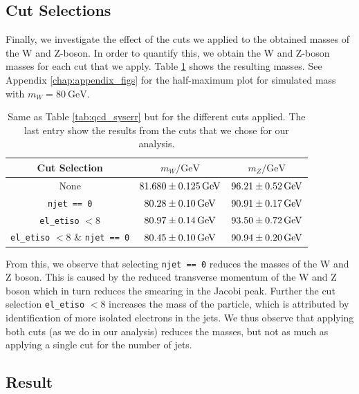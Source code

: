 \documentclass[a4paper]{report}
\numberwithin{equation}{section}
\begin{document}
 
\subsection{Cut Selections}

Finally, we investigate the effect of the cuts we applied to the obtained masses of the W and Z-boson. In order to quantify this, 
we obtain the W and Z-boson masses for each cut that we apply. Table \ref{tab:cut_syserr} shows the resulting masses. See Appendix \ref{chap:appendix_figs}
for the half-maximum plot for simulated mass with $m_W = \SI{80}{\giga\electronvolt}$. 

\begin{table}
    \centering
    \begin{tabular}{|c|c|c|} \hline
    Cut Selection &  $m_W / \si{\giga\electronvolt}$ & $m_Z / \si{\giga\electronvolt}$\\ \hline
    None & $\SI{81.68 \pm 0.125}{\giga\electronvolt}$ & $\SI{96.21 \pm 0.52}{\giga\electronvolt}$ \\ 
    \texttt{njet == 0} & $\SI{80.28 \pm 0.10}{\giga\electronvolt}$ & $\SI{90.91 \pm 0.17}{\giga\electronvolt}$ \\
    \texttt{el\_etiso} $< 8$ & $\SI{80.97 \pm 0.14}{\giga\electronvolt}$ & $\SI{93.50 \pm 0.72}{\giga\electronvolt}$ \\
    \texttt{el\_etiso} $< 8$ \& \texttt{njet == 0} & $\SI{80.45 \pm 0.10}{\giga\electronvolt} $ & $\SI{90.94 \pm 0.20}{\giga\electronvolt}$ \\ \hline
    \end{tabular}
    \caption{Same as Table \ref{tab:qcd_syserr} but for the different cuts applied. The last entry show the results from 
    the cuts that we chose for our analysis.}
    \label{tab:cut_syserr}
\end{table}

From this, we observe that selecting \texttt{njet == 0} reduces the masses of the W and Z boson. This is caused by the reduced 
transverse momentum of the W and Z boson which in turn reduces the smearing in the Jacobi peak. Further the cut selection 
\texttt{el\_etiso} $< 8$ increases the mass of the particle, which is attributed by identification of more isolated electrons in the 
jets. We thus observe that applying both cuts (as we do in our analysis) reduces the masses, but not as much as applying a single 
cut for the number of jets.

\subsection{Result}
\end{document}

